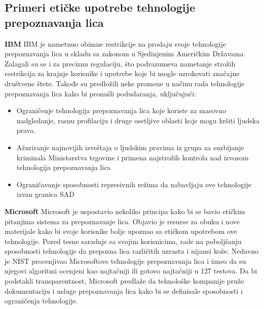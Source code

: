 \documentclass{article}
\begin{document}
\subsection{Primeri etičke upotrebe tehnologije prepoznavanja lica}
\textbf{IBM}
\newline
\newline
IBM je nametnuo obimne restrikcije na prodaju svoje tehnologije prepoznavanja lica u skladu sa zakonom u Sjedinjenim Američkim Državama. 
\newline
\newline
Zalagali su se i za preciznu regulaciju, što podrazumeva nametanje strožih restrikcija za krajnje korisnike i upotrebe koje bi mogle uzrokovati značajne društvene štete. Takođe su predložili neke promene u načinu rada tehnologije prepoznavanja lica kako bi pronašli podudaranja, uključujući:
\begin{itemize}
    \item Ograničenje tehnologija prepoznavanja lica koje koriste za masovno nadgledanje, rasnu profilaciju i druge osetljive oblasti koje mogu kršiti ljudska prava.
    \item Ažuriranje najnovijih izveštaja o ljudskim pravima iz grupa za suzbijanje kriminala Ministarstva trgovine i primena najstrožih kontrola nad izvozom tehnologija prepoznavanja lica 
    \item Ograničavanje sposobnosti represivnih režima da nabavljaju ove tehnologije izvan granica SAD
    
\end{itemize}
\textbf{Microsoft}
\newline
\newline
Microsoft je uspostavio nekoliko principa kako bi se bavio etičkim pitanjima sistema za prepoznavanje lica. Objavio je resurse za obuku i nove materijale kako bi svoje korisnike bolje upoznao sa etičkom upotrebom ove tehnologije.
\newline
\newline
Pored tesne saradnje sa svojim korisnicima, rade na poboljšanju sposobnosti tehnologije da prepozna lica različitih uzrasta i nijansi kože. Nedavno je NIST procenjivao Microsoftove tehnologije prepoznavanja lica i izneo da su njegovi algoritmi ocenjeni kao najtačniji ili gotovo najtačniji u 127 testova. 
\newline
\newline
 Da bi podstakli transparentnost, Microsoft predlaže da tehnološke kompanije pruže dokumentaciju i usluge prepoznavanja lica kako bi se definisale sposobnosti i ograničenja tehnologije.
\newline
\end{document}
